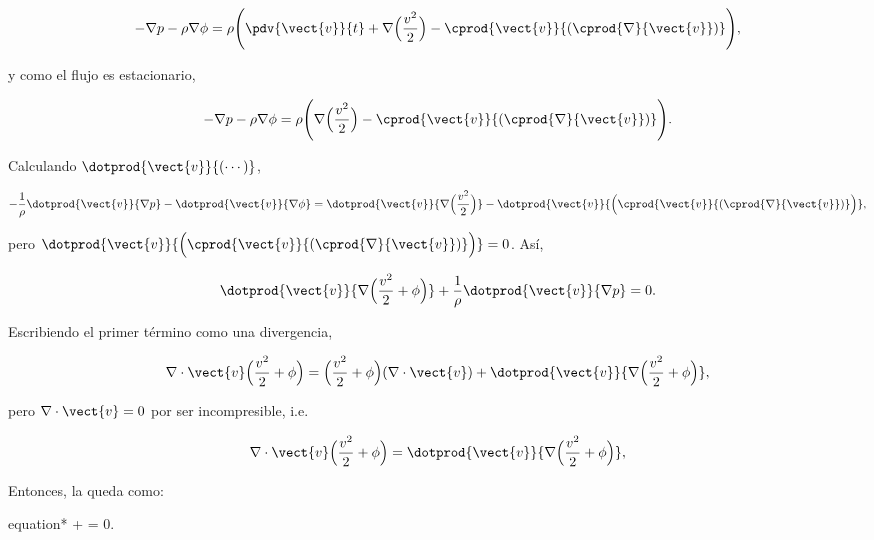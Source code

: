 \documentclass[../main.tex]{subfiles}
\begin{document}
\begin{problema}
	\begin{equation*}
		-\nabla{p} - \rho \nabla{\phi} = \rho \Biggl(\pdv{\vect{v}}{t} + \nabla{\Bigl(\dfrac{v^{2}}{2}\Bigr)} -
		\cprod{\vect{v}}{( \cprod{\nabla}{\vect{v}} )}\Biggr),
	\end{equation*}

	y como el flujo es estacionario,

	\begin{equation}
		-\nabla{p} - \rho \nabla{\phi} = \rho \Biggl(\nabla{\Bigl(\dfrac{v^{2}}{2}\Bigr)} -
		\cprod{\vect{v}}{( \cprod{\nabla}{\vect{v}} )}\Biggr).
		\label{eq:cauchy-p4-dm}
	\end{equation}

	Calculando \(\dotprod{\vect{v}}{(\cdots)}\),

	\begin{equation*}
		-\dfrac{1}{\rho}\dotprod{\vect{v}}{\nabla{p}} - \dotprod{\vect{v}}{\nabla{\phi}} =
		\dotprod{\vect{v}}{\nabla{\Bigl(\dfrac{v^{2}}{2}\Bigr)}} -
		\dotprod{\vect{v}}{\Bigl(\cprod{\vect{v}}{( \cprod{\nabla}{\vect{v}} )}\Bigr)},
	\end{equation*}

	pero \(\dotprod{\vect{v}}{\Bigl(\cprod{\vect{v}}{( \cprod{\nabla}{\vect{v}} )}\Bigr)} = 0\).
	Así,

	\begin{equation}
		\dotprod{\vect{v}}{\nabla{\Bigl(\dfrac{v^{2}}{2} + \phi\Bigr)}} + \dfrac{1}{\rho}
		\dotprod{\vect{v}}{\nabla{p}} = 0.
		\label{eq:cauchy-second-simplification}
	\end{equation}

	Escribiendo el primer término como una divergencia,

	\begin{equation*}
		\nabla \cdot{\vect{v}\Bigl(\dfrac{v^{2}}{2} + \phi\Bigr)} =
		\Bigl(\dfrac{v^{2}}{2} + \phi\Bigr)(\nabla \cdot{\vect{v}}) +
		\dotprod{\vect{v}}{\nabla{\Bigl(\dfrac{v^{2}}{2} + \phi\Bigr)}},
	\end{equation*}

	pero \(\nabla \cdot{\vect{v}} = 0\) por ser incompresible, i.e.

	\begin{equation*}
		\nabla \cdot{\vect{v}\Bigl(\dfrac{v^{2}}{2} + \phi\Bigr)} =
		\dotprod{\vect{v}}{\nabla{\Bigl(\dfrac{v^{2}}{2} + \phi\Bigr)}},
	\end{equation*}

	Entonces, la  queda como:

	\begin{empheq}[box = \mainresult]{equation*}
		\nabla {} +
		  = 0.
	\end{empheq}


\end{problema}
\end{document}
